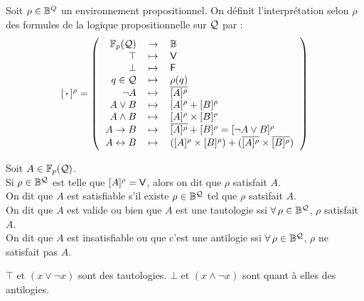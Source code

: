 		\eqskip{3mm}
		\begin{Definition}
			Soit \(\rho \in \bb{B}^Q\) un environnement propositionnel.
			On définit l'interprétation selon \(\rho\) des formules de la logique propositionnelle sur \(\cal{Q}\) par :
				\setlength{\tabcolsep}{2.2pt}
				\[
					[\text{\! \bdot \!}]^\rho = \left( \begin{tabular}[h]{rcl}
						\(\FpQ\) & \(\rightarrow\) & \(\bb{B}\) \\
						\(\top\) & \(\mapsto\) & \(\V\) \\
						\(\bot\) & \(\mapsto\) & \(\F\) \\
						\(q \in \cal{Q}\) & \(\mapsto\) & \(\rho(q)\) \\
						\(\neg A\) & \(\mapsto\) & \(\overline{[A]^\rho}\) \\
						\(A \vee B\) & \(\mapsto\) & \([A]^\rho + [B]^\rho\) \\
						\(A \wedge B\) & \(\mapsto\) & \([A]^\rho \times [B]^\rho\) \\
						\(A \rightarrow B\) & \(\mapsto\) & \(\overline{[A]^\rho} + [B]^\rho = [\neg A \vee B]^\rho\) \\
						\(A \leftrightarrow B\) & \(\mapsto\) & \(([A]^\rho \times [B]^\rho) + (\overline{[A]^\rho} \times \overline{[B]^\rho})\)
					\end{tabular} \right)
				\]
		\end{Definition}
		
		\begin{Definition}
			Soit \(A \in \FpQ\). \\[2mm]
			\bdot Si \(\rho \in \bb{B}^\cal{Q}\) est telle que \([A]^\rho = \V\), alors on dit que \(\rho\) satisfait \(A\). \\
			\bdot On dit que \(A\) est satisfiable s'il existe \(\rho \in \bb{B}^{\cal{Q}}\) tel que \(\rho\) satsifait \(A\). \\
			\bdot On dit que \(A\) est valide ou bien que \(A\) est une tautologie ssi \(\forall \, \rho \in \bb{B}^\cal{Q}\), \(\rho\) satisfait \(A\). \\
			\bdot On dit que \(A\) est insatisfiable ou que c'est une antilogie ssi \(\forall \, \rho \in \bb{B}^\cal{Q}\), \(\rho\) ne satisfait pas \(A\).
		\end{Definition}
		
		\begin{Exemples}
			\(\top\) et \((x \vee \neg x)\) sont des tautologies. \(\bot\) et \((x \wedge \neg x)\) sont quant à elles des antilogies.
		\end{Exemples}
		

